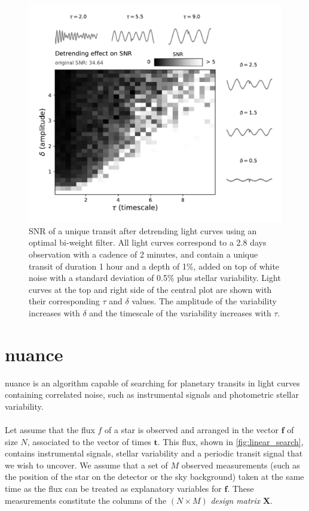 \documentclass{aastex631}
\begin{document}
\begin{figure}[H]
    \begin{centering}
        \includegraphics[width=0.7\linewidth]{../workflows/cleaning_snr/figures/result.pdf}
        \caption{SNR of a unique transit after detrending light curves using an optimal bi-weight filter. All light curves correspond to a 2.8 days observation with a cadence of 2 minutes, and contain a unique transit of duration 1 hour and a depth of 1\%, added on top of white noise with a standard deviation of 0.5\% plus stellar variability. Light curves at the top and right side of the central plot are shown with their corresponding $\tau$ and $\delta$ values. The amplitude of the variability increases with $\delta$ and the timescale of the variability increases with $\tau$.}
        \label{fig:snr_detrend}
    \end{centering}
\end{figure}


\newpage
\section{\textsf{nuance}}\label{nuance}

\textsf{nuance} is an algorithm capable of searching for planetary transits in light curves containing correlated noise, such as instrumental signals and photometric stellar variability.
\\\\
Let assume that the flux $f$ of a star is observed and arranged in the vector $\bm{f}$ of size $N$, associated to the vector of times $\bm{t}$. This flux, shown in \autoref{fig:linear_search}, contains instrumental signals, stellar variability and a periodic transit signal that we wish to uncover. We assume that a set of $M$ observed measurements (such as the position of the star on the detector or the sky background) taken at the same time as the flux can be treated as explanatory variables for $\bm{f}$. These measurements constitute the columns of the $(N\times M)$ \textit{design matrix} $\bm{X}$.\\\\
\end{document}
